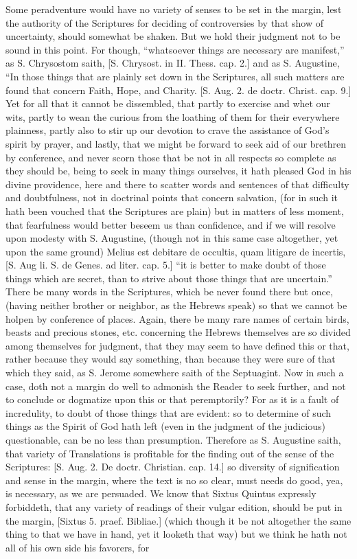 {\par }{\IP Some peradventure would have no variety of senses to be set in the margin, lest the authority of the Scriptures for deciding of controversies by that show of uncertainty, should somewhat be shaken. But we hold their judgment not to be sound in this point. For though, “whatsoever things are necessary are manifest,” as S. Chrysostom saith, [S. Chrysost. in II. Thess. cap. 2.] and as S. Augustine, “In those things that are plainly set down in the Scriptures, all such matters are found that concern Faith, Hope, and Charity. [S. Aug. 2. de doctr. Christ. cap. 9.] Yet for all that it cannot be dissembled, that partly to exercise and whet our wits, partly to wean the curious from the loathing of them for their everywhere plainness, partly also to stir up our devotion to crave the assistance of God’s spirit by prayer, and lastly, that we might be forward to seek aid of our brethren by conference, and never scorn those that be not in all respects so complete as they should be, being to seek in many things ourselves, it hath pleased God in his divine providence, here and there to scatter words and sentences of that difficulty and doubtfulness, not in doctrinal points that concern salvation, (for in such it hath been vouched that the Scriptures are plain) but in matters of less moment, that fearfulness would better beseem us than confidence, and if we will resolve upon modesty with S. Augustine, (though not in this same case altogether, yet upon the same ground) Melius est debitare de occultis, quam litigare de incertis, [S. Aug li. S. de Genes. ad liter. cap. 5.] “it is better to make doubt of those things which are secret, than to strive about those things that are uncertain.” There be many words in the Scriptures, which be never found there but once, (having neither brother or neighbor, as the Hebrews speak) so that we cannot be holpen by conference of places. Again, there be many rare names of certain birds, beasts and precious stones, etc. concerning the Hebrews themselves are so divided among themselves for judgment, that they may seem to have defined this or that, rather because they would say something, than because they were sure of that which they said, as S. Jerome somewhere saith of the Septuagint. Now in such a case, doth not a margin do well to admonish the Reader to seek further, and not to conclude or dogmatize upon this or that peremptorily? For as it is a fault of incredulity, to doubt of those things that are evident: so to determine of such things as the Spirit of God hath left (even in the judgment of the judicious) questionable, can be no less than presumption. Therefore as S. Augustine saith, that variety of Translations is profitable for the finding out of the sense of the Scriptures: [S. Aug. 2. De doctr. Christian. cap. 14.] so diversity of signification and sense in the margin, where the text is no so clear, must needs do good, yea, is necessary, as we are persuaded. We know that Sixtus Quintus expressly forbiddeth, that any variety of readings of their vulgar edition, should be put in the margin, [Sixtus 5. praef. Bibliae.] (which though it be not altogether the same thing to that we have in hand, yet it looketh that way) but we think he hath not all of his own side his favorers, for }
